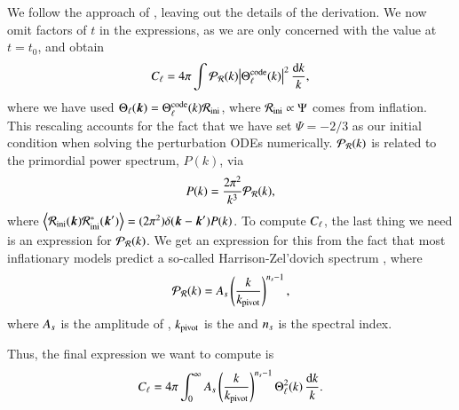 We follow the approach of \cite[Ch. 9.5]{Dodelson}, leaving out the details of the derivation. We now omit factors of $t$ in the expressions, as we are only concerned with the value at $t=t_0$, and obtain   
\begin{equation} \label{eq:M4:theory:C_ell_integral_definition}
    C_\ell = 4\pi \int \mathcal{P}_{\mathcal{R}} (k) \abs{\Theta_\ell^\mathrm{code}(k)}^2 \,\frac{\dd k}{k},
\end{equation}
where we have used $\Theta_\ell(\boldsymbol{k})= \Theta_\ell^\mathrm{code}(k) \mathcal{R}_\mathrm{ini}$, where $\mathcal{R}_\mathrm{ini}\propto\Psi$ comes from inflation. This rescaling accounts for the fact that we have set $\Psi=-2/3$ as our initial condition when solving the perturbation ODEs numerically. $\mathcal{P}_{\mathcal{R}}(k)$ is related to the primordial power spectrum, $P(k)$, via 
\begin{equation} \label{eq:M4:theory:primordial_power_spectrum_}
    P(k) = \frac{2\pi^2}{k^3}\mathcal{P}_{\mathcal{R}}(k),
\end{equation}
where $\expval{\mathcal{R}_\mathrm{ini}(\ensuremath{\boldsymbol{k}}) \mathcal{R}_\mathrm{ini}^*(\ensuremath{\boldsymbol{k}}')}=(2\pi^2)\delta(\boldsymbol{k}-\boldsymbol{k}') P(k)$. To compute $C_\ell$, the last thing we need is an expression for $\mathcal{P}_{\mathcal{R}}(k)$. We get an expression for this from the fact that most inflationary models predict a so-called Harrison-Zel'dovich spectrum , where 
\begin{equation} \label{eq:M4:theory:primordial_power_spectrum}
    \mathcal{P}_{\mathcal{R}}(k) = A_s \left( \frac{k}{k_\mathrm{pivot}} \right)^{n_s-1}, 
\end{equation}
where $A_s$ is the amplitude of , $k_\mathrm{pivot}$ is the  and $n_s$ is the spectral index.  

Thus, the final expression we want to compute is 
\begin{equation} \label{eq:M4:theory:CMB_power_spectrum}
    C_\ell = 4\pi \int_0^\infty A_s \left( \frac{k}{k_\mathrm{pivot}} \right)^{n_s-1} \Theta_\ell^2(k) \, \frac{\dd k}{k}.
\end{equation}

